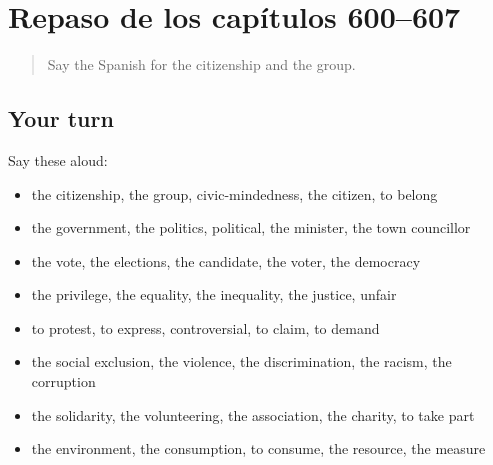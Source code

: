 \section[(dialogue)]{Repaso de los capítulos 600–607}

\label{lesson:ES-R607-repaso-600-607}



\begin{quote}
Say the Spanish for the citizenship and the group.
\end{quote}

\subsection*{Your turn}
Say these aloud:

\begin{itemize}
\raggedright
  \item the citizenship, the group, civic-mindedness, the citizen, to belong
  \item the government, the politics, political, the minister, the town councillor
  \item the vote, the elections, the candidate, the voter, the democracy
  \item the privilege, the equality, the inequality, the justice, unfair
  \item to protest, to express, controversial, to claim, to demand
  \item the social exclusion, the violence, the discrimination, the racism, the corruption
  \item the solidarity, the volunteering, the association, the charity, to take part
  \item the environment, the consumption, to consume, the resource, the measure
\end{itemize}

